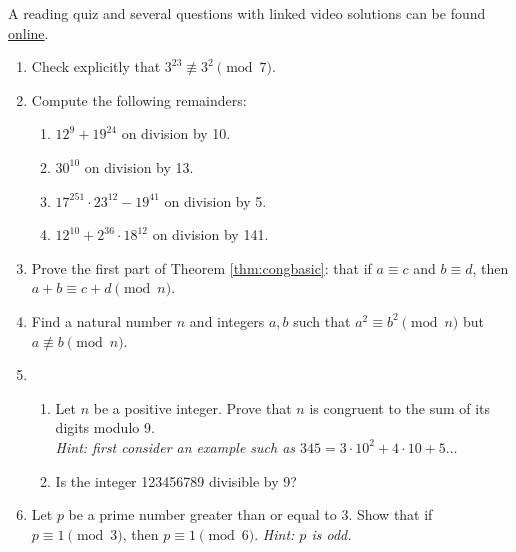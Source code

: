 \begin{exercises}{}{}
	A reading quiz and several questions with linked video solutions can be found \href{http://www.math.uci.edu/~ndonalds/math13/selftest/3-1-cong.html}{online}.


\begin{enumerate}
  \item Check explicitly that $3^{23}\not\equiv 3^2\pmod 7$.
  
  \item Compute the following remainders:
  \begin{enumerate}
  	\item $12^9+19^{24}$ on division by 10.
  	\item $30^{10}$ on division by 13.
  	\item $17^{251}\cdot 23^{12}-19^{41}$ on division by 5.%
  	\item $12^{10}+2^{36}\cdot 18^{12}$ on division by 141.%
  \end{enumerate}
  
    \item Prove the first part of Theorem \ref{thm:congbasic}: that if $a\equiv c$ and $b\equiv d$, then $a+b\equiv c+d\pmod n$.
  
 
 
  \item Find a natural number $n$ and integers $a,b$ such that $a^2\equiv b^2\pmod n$ but $a\not\equiv b\pmod n$.
  
  
  
    
  
  \item\begin{enumerate}
    \item Let $n$ be a positive integer. Prove that $n$ is congruent to the sum of its digits modulo 9.\\
    \emph{Hint: first consider an example such as $345=3\cdot 10^2+4\cdot 10+5\ldots$}
    \item Is the integer 123456789 divisible by 9?
  \end{enumerate}
  
  \item Let $p$ be a prime number greater than or equal to 3. Show that if $p\equiv 1\pmod 3$, then $p\equiv 1\pmod 6$. \emph{Hint: $p$ is odd.} 
  

\end{enumerate}
\end{exercises}
